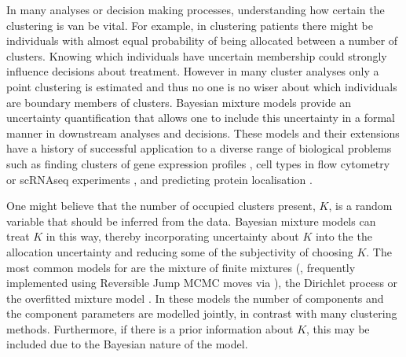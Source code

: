 \documentclass{bioinfo}
\begin{document}
In many analyses or decision making processes, understanding how certain the clustering is van be vital. For example, in clustering patients there might be individuals with almost equal probability of being allocated between a number of clusters. Knowing which individuals have uncertain membership could strongly influence decisions about treatment. However in many cluster analyses only a point clustering is estimated and thus no one is no wiser about which individuals are boundary members of clusters. Bayesian mixture models provide an uncertainty quantification that allows one to include this uncertainty in a formal manner in downstream analyses and decisions. These models and their extensions have a history of successful application to a diverse range of biological problems such as finding clusters of gene expression profiles \citep{medvedovic2002bayesian}, cell types in flow cytometry \citep{chan2008statistical, hejblum2019sequential} or scRNAseq experiments \citep{prabhakaran2016dirichlet}, and predicting protein localisation \citep{crook2018bayesian}.

One might believe that the number of occupied clusters present, $K$, is a random variable that should be inferred from the data. Bayesian mixture models can treat $K$ in this way, thereby incorporating uncertainty about $K$ into the the allocation uncertainty and reducing some of the subjectivity of choosing $K$. The most common models for are the mixture of finite mixtures (\citealp{miller2018mixture}, frequently implemented using Reversible Jump MCMC moves via \citealp{richardson1997bayesian}), the Dirichlet process \citep{ferguson1973bayesian, neal2000markov} or the overfitted mixture model \citep{van2015overfitting}. In these models the number of components and the component parameters are modelled jointly, in contrast with many clustering methods. Furthermore, if there is a prior information about $K$, this may be included due to the Bayesian nature of the model. 
\end{document}

